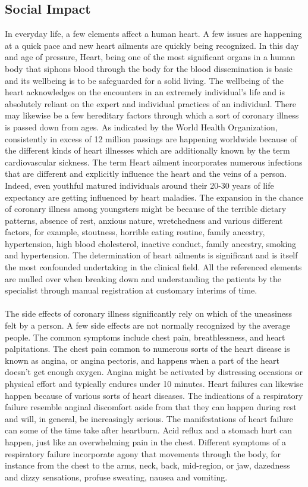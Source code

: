 \documentclass[oneside,12pt]{Classes/VTU}
\begin{document}
    \subsection{Social Impact}
    In everyday life, a few elements affect a human heart. A few issues are happening at a quick pace and new heart ailments are quickly being recognized. In this day and age of pressure, Heart, being one of the most significant organs in a human body that siphons blood through the body for the blood dissemination is basic and its wellbeing is to be safeguarded for a solid living. The wellbeing of the heart acknowledges on the encounters in an extremely individual's life and is absolutely reliant on the expert and individual practices of an individual. There may likewise be a few hereditary factors through which a sort of coronary illness is passed down from ages. As indicated by the World Health Organization, consistently in excess of 12 million passings are happening worldwide because of the different kinds of heart illnesses which are additionally known by the term cardiovascular sickness. The term Heart ailment incorporates numerous infections that are different and explicitly influence the heart and the veins of a person. Indeed, even youthful matured individuals around their 20-30 years of life expectancy are getting influenced by heart maladies. The expansion in the chance of coronary illness among youngsters might be because of the terrible dietary patterns, absence of rest, anxious nature, wretchedness and various different factors, for example, stoutness, horrible eating routine, family ancestry, hypertension, high blood cholesterol, inactive conduct, family ancestry, smoking and hypertension. The determination of heart ailments is significant and is itself the most confounded undertaking in the clinical field. All the referenced elements are mulled over when breaking down and understanding the patients by the specialist through manual registration at customary interims of time.
    \paragraph{}
    The side effects of coronary illness significantly rely on which of the uneasiness felt by a person. A few side effects are not normally recognized by the average people. The common symptoms include chest pain, breathlessness, and heart palpitations. The chest pain common to numerous sorts of the heart disease is known as angina, or angina pectoris, and happens when a part of the heart doesn't get enough oxygen. Angina might be activated by distressing occasions or physical effort and typically endures under 10 minutes. Heart failures can likewise happen because of various sorts of heart diseases. The indications of a respiratory failure resemble anginal discomfort aside from that they can happen during rest and will, in general, be increasingly serious. The manifestations of heart failure can some of the time take after heartburn. Acid reflux and a stomach hurt can happen, just like an overwhelming pain in the chest. Different symptoms of a respiratory failure incorporate agony that movements through the body, for instance from the chest to the arms, neck, back, mid-region, or jaw, dazedness and dizzy sensations, profuse sweating, nausea and vomiting.
\end{document}
